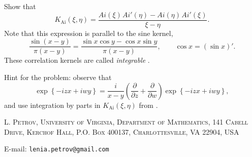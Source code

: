 \documentclass[letterpaper,11pt,oneside,reqno]{article}
\numberwithin{equation}{section}
\newcommand{\ssp}{\hspace{1pt}}
\theoremstyle{definition}
\begin{document}
Show that
\begin{equation*}
	K_{\mathrm{Ai}}(\xi,\eta)=
	\frac{Ai(\xi)\ssp Ai'(\eta)-Ai(\eta)\ssp Ai'(\xi)}{\xi-\eta}.
\end{equation*}
Note that this expression is parallel to the sine kernel,
\begin{equation*}
	\frac{\sin(x-y)}{\pi(x-y)}=\frac{\sin x\cos y-\cos x\sin y}{\pi(x-y)},\qquad
	\cos x=(\sin x)'.
\end{equation*}
These correlation kernels are called \emph{integrable}
\cite{its1990differential}.

Hint for the problem: observe that
\begin{equation*}
	\exp\left\{ -i z x+iwy \right\}=\frac{i}{x-y}\left( \frac{\partial}{\partial z}+
	\frac{\partial}{\partial w}\right)\exp\left\{ -i z x+iwy \right\},
\end{equation*}
and use integration by parts in $K_{\mathrm{Ai}}(\xi,\eta)$
from .








\medskip

\textsc{L. Petrov, University of Virginia, Department of Mathematics, 141 Cabell Drive, Kerchof Hall, P.O. Box 400137, Charlottesville, VA 22904, USA}

E-mail: \texttt{lenia.petrov@gmail.com}
\end{document}
